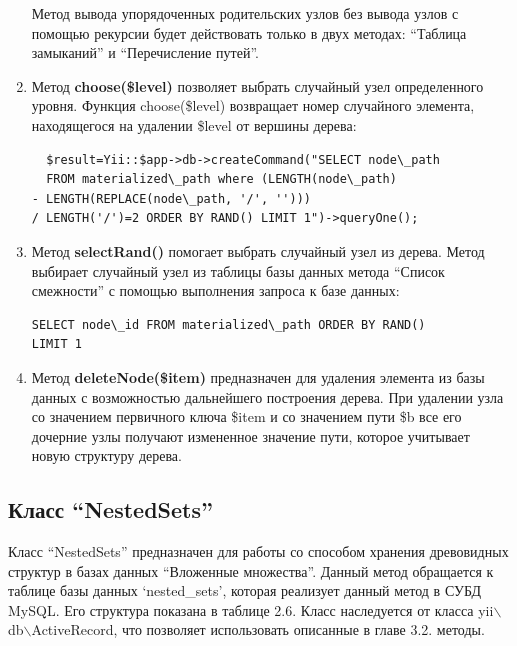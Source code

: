 \documentclass[a4paper,14pt]{extreport}
\theoremstyle{definition}
\begin{document}
\begin{enumerate}
Метод вывода упорядоченных родительских узлов без вывода узлов с помощью рекурсии будет действовать только в двух методах: “Таблица замыканий” и “Перечисление путей”.
\item Метод \textbf{choose(\$level)} позволяет выбрать случайный узел определенного уровня. Функция choose(\$level) возвращает номер случайного элемента, находящегося на удалении \$level от вершины дерева:
\begin{verbatim}
  $result=Yii::$app->db->createCommand("SELECT node\_path
  FROM materialized\_path where (LENGTH(node\_path)
- LENGTH(REPLACE(node\_path, '/', '')))
/ LENGTH('/')=2 ORDER BY RAND() LIMIT 1")->queryOne();\end{verbatim}
\item Метод \textbf{selectRand()} помогает выбрать случайный узел из дерева. Метод выбирает случайный узел из таблицы базы данных метода “Список смежности” с помощью выполнения запроса к базе данных:\begin{verbatim}
SELECT node\_id FROM materialized\_path ORDER BY RAND()
LIMIT 1 \end{verbatim}
\item Метод \textbf{deleteNode(\$item)} предназначен для удаления элемента из базы данных с возможностью дальнейшего построения дерева.
При удалении узла со значением первичного ключа \$item и со значением пути \$b все его дочерние узлы получают измененное значение пути, которое учитывает новую структуру дерева.
\end{enumerate}
\subsection{Класс “NestedSets”}
Класс “NestedSets” предназначен для работы со способом хранения древовидных структур в базах данных “Вложенные множества”. Данный метод обращается к таблице базы данных ‘nested\_sets’, которая реализует данный метод в СУБД MySQL. Его структура показана в таблице 2.6. Класс наследуется от класса yii$\backslash$db$\backslash$ActiveRecord, что позволяет использовать описанные в главе 3.2. методы.
\end{document}
